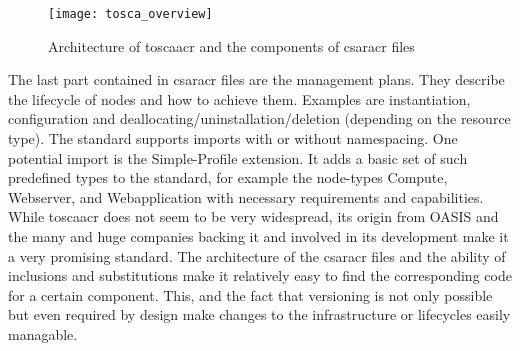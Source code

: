 \begin{figure}[H]
  \texttt{[image: tosca\_overview]}
  \centering
  \caption{Architecture of \gls{toscaacr} and the components of \gls{csaracr} files} %
  \label{image:tosca_overview}
\end{figure}

The last part contained in \gls{csaracr} files are the management plans. They describe the lifecycle of nodes and how to achieve them. Examples are instantiation, configuration and deallocating/uninstallation/deletion (depending on the resource type).
\newline
\newline
The standard supports imports with or without namespacing. One potential import is the Simple-Profile extension.
It adds a basic set of such predefined types to the standard, for example the node-types Compute, Webserver, and Webapplication with necessary requirements and capabilities.
\newline
While \gls{toscaacr} does not seem to be very widespread, its origin from OASIS and the many and huge companies backing it and involved in its development make it a very promising standard.
\newline
The architecture of the \gls{csaracr} files and the ability of inclusions and substitutions make it relatively easy to find the corresponding code for a certain component.
\newline
This, and the fact that versioning is not only possible but even required by design make changes to the infrastructure or lifecycles easily managable.




